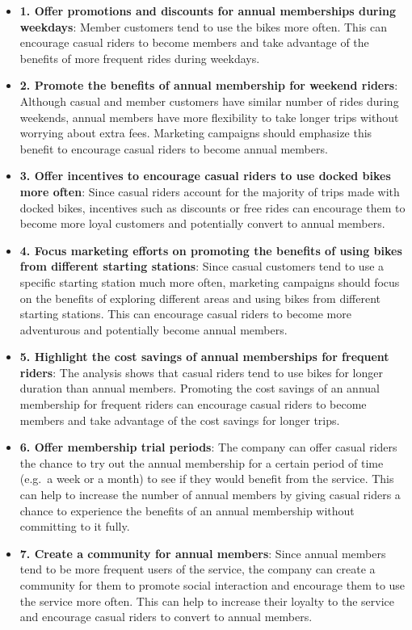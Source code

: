 \documentclass[
]{article}
\begin{document}
\begin{itemize}
\item
  \textbf{1. Offer promotions and discounts for annual memberships
  during weekdays}: Member customers tend to use the bikes more often.
  This can encourage casual riders to become members and take advantage
  of the benefits of more frequent rides during weekdays.
\item
  \textbf{2. Promote the benefits of annual membership for weekend
  riders}: Although casual and member customers have similar number of
  rides during weekends, annual members have more flexibility to take
  longer trips without worrying about extra fees. Marketing campaigns
  should emphasize this benefit to encourage casual riders to become
  annual members.
\item
  \textbf{3. Offer incentives to encourage casual riders to use docked
  bikes more often}: Since casual riders account for the majority of
  trips made with docked bikes, incentives such as discounts or free
  rides can encourage them to become more loyal customers and
  potentially convert to annual members.
\item
  \textbf{4. Focus marketing efforts on promoting the benefits of using
  bikes from different starting stations}: Since casual customers tend
  to use a specific starting station much more often, marketing
  campaigns should focus on the benefits of exploring different areas
  and using bikes from different starting stations. This can encourage
  casual riders to become more adventurous and potentially become annual
  members.
\item
  \textbf{5. Highlight the cost savings of annual memberships for
  frequent riders}: The analysis shows that casual riders tend to use
  bikes for longer duration than annual members. Promoting the cost
  savings of an annual membership for frequent riders can encourage
  casual riders to become members and take advantage of the cost savings
  for longer trips.
\item
  \textbf{6. Offer membership trial periods}: The company can offer
  casual riders the chance to try out the annual membership for a
  certain period of time (e.g.~a week or a month) to see if they would
  benefit from the service. This can help to increase the number of
  annual members by giving casual riders a chance to experience the
  benefits of an annual membership without committing to it fully.
\item
  \textbf{7. Create a community for annual members}: Since annual
  members tend to be more frequent users of the service, the company can
  create a community for them to promote social interaction and
  encourage them to use the service more often. This can help to
  increase their loyalty to the service and encourage casual riders to
  convert to annual members.
\end{itemize}
\end{document}
